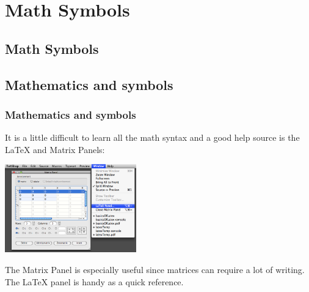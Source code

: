 \section{Math Symbols}
\subsection{Math Symbols}

\subsection[Mathematics and symbols]{Mathematics and symbols}

\begin{frame} \frametitle{Mathematics and symbols}
	It is a little difficult to learn all the math syntax and a good help source is the LaTeX and Matrix Panels:
	\begin{center}
		\includegraphics[height=1.5in]{math/images/panels}
	\end{center}
	The Matrix Panel is especially useful since matrices can require a lot of writing. The LaTeX panel is handy as a quick reference.
\end{frame}

